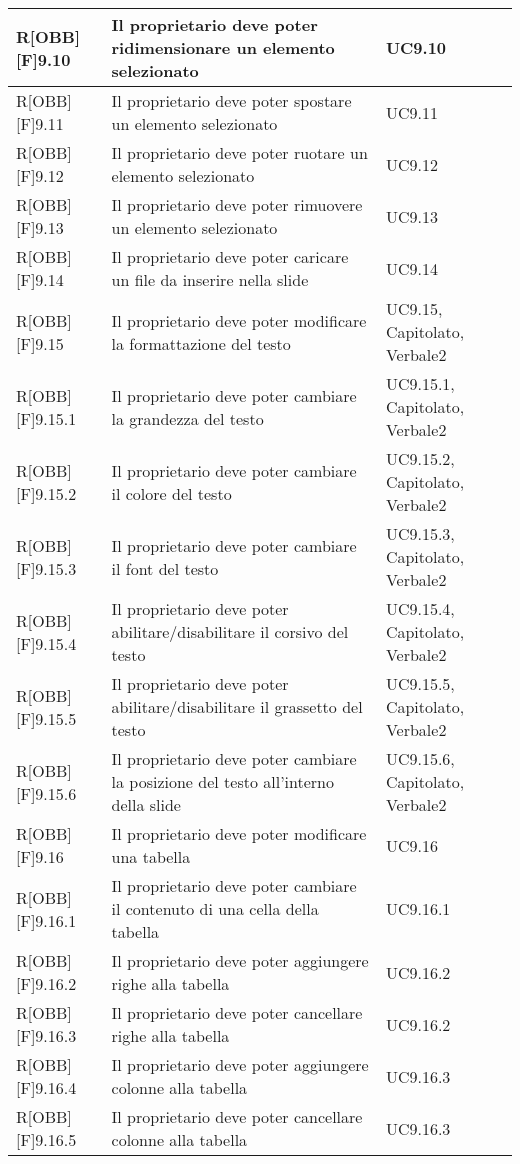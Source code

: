 	\begin{table}[h]
		\begin{tabular}{|p{}|p{}|p{}|}
			\midrule
			
			R[OBB][F]9.10 & Il proprietario deve poter ridimensionare un elemento selezionato & UC9.10 \\ \midrule
			R[OBB][F]9.11 & Il proprietario deve poter spostare un elemento selezionato & UC9.11 \\ \midrule
			R[OBB][F]9.12 & Il proprietario deve poter ruotare un elemento selezionato & UC9.12 \\ \midrule
			R[OBB][F]9.13 & Il proprietario deve poter rimuovere un elemento selezionato & UC9.13 \\ \midrule
			R[OBB][F]9.14 & Il proprietario deve poter caricare un file da inserire nella \gls{slide} & UC9.14 \\ \midrule
			R[OBB][F]9.15 & Il proprietario deve poter modificare la formattazione del testo & UC9.15, Capitolato, Verbale2 \\ \midrule
			R[OBB][F]9.15.1 & Il proprietario deve poter cambiare la grandezza del testo & UC9.15.1, Capitolato, Verbale2 \\ \midrule
			R[OBB][F]9.15.2 & Il proprietario deve poter cambiare il colore del testo & UC9.15.2, Capitolato, Verbale2 \\ \midrule
			R[OBB][F]9.15.3 & Il proprietario deve poter cambiare il \gls{font} del testo & UC9.15.3, Capitolato, Verbale2 \\ \midrule
			R[OBB][F]9.15.4 & Il proprietario deve poter abilitare/disabilitare il corsivo del testo & UC9.15.4, Capitolato, Verbale2 \\ \midrule
			R[OBB][F]9.15.5 & Il proprietario deve poter abilitare/disabilitare il grassetto del testo & UC9.15.5, Capitolato, Verbale2 \\ \midrule
			R[OBB][F]9.15.6 & Il proprietario deve poter cambiare la posizione del testo all'interno della \gls{slide} & UC9.15.6, Capitolato, Verbale2 \\ \midrule
			R[OBB][F]9.16 & Il proprietario deve poter modificare una tabella & UC9.16 \\ \midrule
			R[OBB][F]9.16.1 & Il proprietario deve poter cambiare il contenuto di una cella della tabella & UC9.16.1 \\ \midrule
			R[OBB][F]9.16.2 & Il proprietario deve poter aggiungere righe alla tabella & UC9.16.2 \\ \midrule
			R[OBB][F]9.16.3 & Il proprietario deve poter cancellare righe alla tabella & UC9.16.2 \\ \midrule
			R[OBB][F]9.16.4 & Il proprietario deve poter aggiungere colonne alla tabella & UC9.16.3 \\ \midrule
			R[OBB][F]9.16.5 & Il proprietario deve poter cancellare colonne alla tabella & UC9.16.3 \\ \midrule

		\end{tabular}
	\end{table}
	\newpage
	

